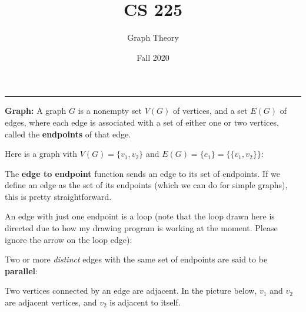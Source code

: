 \documentclass[11pt]{article}
\title{CS 225}
\author{Graph Theory}
\date{Fall 2020}
\begin{document}
\maketitle
\hrule

\bigskip

{\bf Graph:} A graph $G$ is a nonempty set $V(G)$ of vertices,
and a set $E(G)$ of edges, where each edge is associated with a 
set of either one or two vertices, called the {\bf endpoints} 
of that edge. 

\bigskip
Here is a graph vith $V(G) = \{v_1, v_2\}$ and $E(G) = \{e_1\} = \{\{v_1, v_2\}\}$: 

\begin{center}
\end{center}

\bigskip 
The {\bf edge to endpoint} function sends an edge to its set of endpoints. 
If we define an edge as the set of its endpoints (which we can do for simple 
graphs), this is pretty straightforward. 

\bigskip
An edge with just one endpoint is a loop (note that the loop drawn here is 
directed due to how my drawing program is working at the moment. Please 
ignore the arrow on the loop edge):
\begin{center}
\end{center}

Two or more {\it distinct} edges with the same set of endpoints are said 
to be {\bf parallel}:

\begin{center}
\end{center}

Two vertices connected by an edge are adjacent. In the picture below, $v_1$ 
and $v_2$ are adjacent vertices, and $v_2$ is adjacent to itself.
\end{document}
